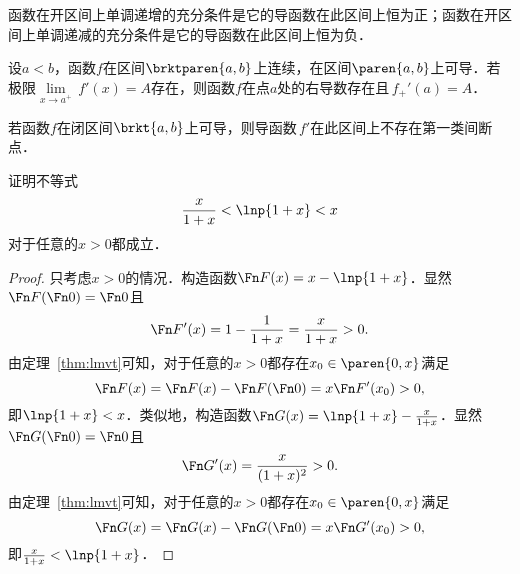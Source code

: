 \begin{corollary}
  \label{cor:lmvtmono}
  函数在开区间上单调递增的充分条件是它的导函数在此区间上恒为正；函数在开区间上单调递减的充分条件是它的导函数在此区间上恒为负．
\end{corollary}

\begin{corollary*}
  设\(a < b\)，函数\(f\)在区间\(\brktparen{a,b}\)上连续，在区间\(\paren{a,b}\)上可导．若极限\(\!\lim\limits_{x\to a^+} \,f'(x) = A\)存在，则函数\(f\)在点\(a\)处的右导数存在且\(\,f_+'(a) = A\)．
\end{corollary*}

\begin{corollary*}
  若函数\(f\)在闭区间\(\brkt{a,b}\)上可导，则导函数\(\,f'\!\)在此区间上不存在第一类间断点．
\end{corollary*}

\begin{example*}
  证明不等式
  \begin{equation*}
    \frac{x}{1+x} < \lnp{1+x} < x
  \end{equation*}
  对于任意的\(x > 0\)都成立．

  \begin{proof}
    只考虑\(x > 0\)的情况．构造函数\(\Fn F(x) = x - \lnp{1+x}\)．显然\(\Fn F(\Fn0) = \Fn0\)且
    \begin{equation*}
      \Fn F'(x) = 1 - \frac{1}{1+x} = \frac{x}{1+x} > 0.
    \end{equation*}
    由定理~\ref{thm:lmvt}可知，对于任意的\(x > 0\)都存在\(x_0 \in \paren{0,x}\)满足
    \begin{equation*}
      \Fn F(x) = \Fn F(x) - \Fn F(\Fn0) = x \Fn F'(x_0) > 0,
    \end{equation*}
    即\(\lnp{1+x} < x\)．类似地，构造函数\(\Fn G(x) = \lnp{1+x} - \frac{x}{1+x}\)．显然\(\Fn G(\Fn0) = \Fn0\)且
    \begin{equation*}
      \Fn G'(x) = \frac{x}{(1+x)^2} > 0.
    \end{equation*}
    由定理~\ref{thm:lmvt}可知，对于任意的\(x > 0\)都存在\(x_0 \in \paren{0,x}\)满足
    \begin{equation*}
      \Fn G(x) = \Fn G(x) - \Fn G(\Fn0) = x \Fn G'(x_0) > 0,
    \end{equation*}
    即\(\frac{x}{1+x} < \lnp{1+x}\)．
  \end{proof}
\end{example*}


